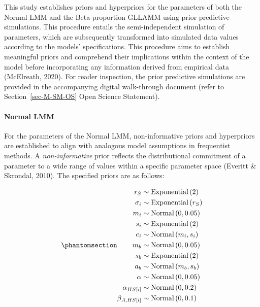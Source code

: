 \documentclass[
]{agujournal2019}
\let\oldparagraph\paragraph
\renewcommand{\paragraph}[1]{\oldparagraph{#1}\mbox{}}
\begin{document}
This study establishes priors and hyperpriors for the parameters of both
the Normal LMM and the Beta-proportion GLLAMM using prior predictive
simulations. This procedure entails the semi-independent simulation of
parameters, which are subsequently transformed into simulated data
values according to the models' specifications. This procedure aims to
establish meaningful priors and comprehend their implications within the
context of the model before incorporating any information derived from
empirical data (McElreath, 2020). For reader inspection, the prior
predictive simulations are provided in the accompanying digital
walk-through document (refer to Section~\ref{sec-M-SM-OS} Open Science
Statement).

\paragraph{Normal LMM}\label{sec-M-SM-P-NLMM}

For the parameters of the Normal LMM, non-informative priors and
hyperpriors are established to align with analogous model assumptions in
frequentist methods. A \emph{non-informative} prior reflects the
distributional commitment of a parameter to a wide range of values
within a specific parameter space (Everitt \& Skrondal, 2010). The
specified priors are as follows:

\begin{equation}\phantomsection\label{eq-normal-LMM-priors}{
\begin{aligned}
r_{S} &\sim \text{Exponential}\left( 2 \right) \\ 
\sigma_{i} &\sim \text{Exponential}\left( r_{S} \right) \\
m_{i} &\sim \text{Normal} \left( 0, 0.05 \right) \\
s_{i} &\sim \text{Exponential} \left( 2 \right) \\
e_{i} &\sim \text{Normal} \left( m_{i}, s_{i} \right) \\
m_{b} &\sim \text{Normal} \left( 0, 0.05 \right) \\
s_{b} &\sim \text{Exponential} \left( 2 \right) \\
a_{b} &\sim \text{Normal} \left( m_{b}, s_{b} \right) \\
\alpha &\sim \text{Normal} \left( 0, 0.05 \right) \\
\alpha_{HS[i]} &\sim \text{Normal} \left( 0, 0.2 \right) \\
\beta_{A,HS[i]} &\sim \text{Normal} \left( 0, 0.1 \right)
\end{aligned} 
}\end{equation}
\end{document}

